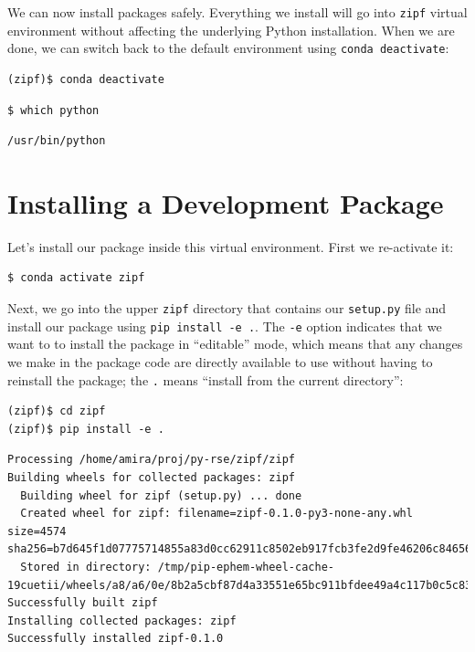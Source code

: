\documentclass[
]{krantz}
\begin{document}
We can now install packages safely.
Everything we install will go into \texttt{zipf} virtual environment
without affecting the underlying Python installation.
When we are done,
we can switch back to the default environment using \texttt{conda\ deactivate}:

\begin{verbatim}
(zipf)$ conda deactivate
\end{verbatim}

\begin{verbatim}
$ which python
\end{verbatim}

\begin{verbatim}
/usr/bin/python
\end{verbatim}

\hypertarget{packaging-installing}{%
\section{Installing a Development Package}\label{packaging-installing}}

Let's install our package inside this virtual environment.
First we re-activate it:

\begin{verbatim}
$ conda activate zipf
\end{verbatim}

Next,
we go into the upper \texttt{zipf} directory that contains our \texttt{setup.py} file
and install our package using \texttt{pip\ install\ -e\ .}.
The \texttt{-e} option indicates that we want to to install the package in ``editable'' mode,
which means that any changes we make in the package code are directly available to use
without having to reinstall the package;
the \texttt{.} means ``install from the current directory'':

\begin{verbatim}
(zipf)$ cd zipf
(zipf)$ pip install -e .
\end{verbatim}

\begin{verbatim}
Processing /home/amira/proj/py-rse/zipf/zipf
Building wheels for collected packages: zipf
  Building wheel for zipf (setup.py) ... done
  Created wheel for zipf: filename=zipf-0.1.0-py3-none-any.whl size=4574 sha256=b7d645f1d07775714855a83d0cc62911c8502eb917fcb3fe2d9fe46206c84656
  Stored in directory: /tmp/pip-ephem-wheel-cache-19cuetii/wheels/a8/a6/0e/8b2a5cbf87d4a33551e65bc911bfdee49a4c117b0c5c834a47
Successfully built zipf
Installing collected packages: zipf
Successfully installed zipf-0.1.0
\end{verbatim}
\end{document}
